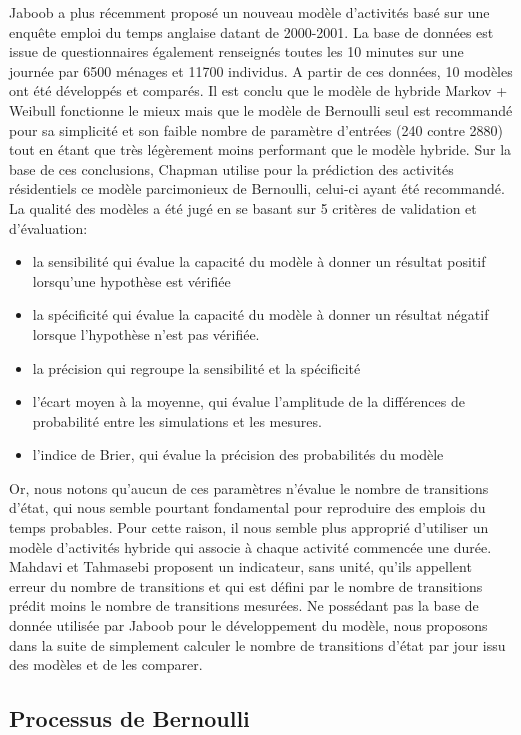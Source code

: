 Jaboob \cite{Jaboob-16} a plus récemment proposé un nouveau modèle d'activités basé sur une enquête emploi du temps anglaise datant de 2000-2001. La base de données est issue de questionnaires également renseignés toutes les 10 minutes sur une journée par 6500 ménages et 11700 individus. A partir de ces données, 10 modèles ont été développés et comparés. Il est conclu que le modèle de hybride Markov + Weibull fonctionne le mieux mais que le modèle de Bernoulli seul est recommandé pour sa simplicité et son faible nombre de paramètre d'entrées (240 contre 2880) tout en étant que très légèrement moins performant que le modèle hybride. Sur la base de ces conclusions, Chapman \cite{Chapman-16} utilise pour la prédiction des activités résidentiels ce modèle parcimonieux de Bernoulli, celui-ci ayant été recommandé. La qualité des modèles a été jugé en se basant sur 5 critères de validation et d'évaluation: 
\begin{itemize}
\item la sensibilité qui évalue la capacité du modèle à donner un résultat positif lorsqu'une hypothèse est vérifiée
\item la spécificité qui évalue la capacité du modèle à donner un résultat négatif lorsque l'hypothèse n'est pas vérifiée.
\item la précision qui regroupe la sensibilité et la spécificité
\item l'écart moyen à la moyenne, qui évalue l'amplitude de la différences de probabilité entre les simulations et les mesures.
\item l'indice de Brier, qui évalue la précision des probabilités du modèle
\end{itemize}

Or, nous notons qu'aucun de ces paramètres n'évalue le nombre de transitions d'état, qui nous semble pourtant fondamental pour reproduire des emplois du temps probables. Pour cette raison, il nous semble plus approprié d'utiliser un modèle d'activités hybride qui associe à chaque activité commencée une durée. Mahdavi et Tahmasebi \cite{Mahdavi-15} proposent un indicateur, sans unité, qu'ils appellent erreur du nombre de transitions et qui est défini par le nombre de transitions prédit moins le nombre de transitions mesurées. Ne possédant pas la base de donnée utilisée par Jaboob pour le développement du modèle, nous proposons dans la suite de simplement calculer le nombre de transitions d'état par jour issu des modèles et de les comparer.

\subsection{Processus de Bernoulli}

